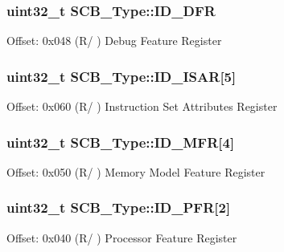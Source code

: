 \subsubsection[{\texorpdfstring{I\+D\+\_\+\+D\+FR}{ID_DFR}}]{ uint32\+\_\+t S\+C\+B\+\_\+\+Type\+::\+I\+D\+\_\+\+D\+FR}\hypertarget{structSCB__Type_a5a8f354519f1ff34593533f095a33679}{}\label{structSCB__Type_a5a8f354519f1ff34593533f095a33679}
Offset\+: 0x048 (R/ ) Debug Feature Register 
\subsubsection[{\texorpdfstring{I\+D\+\_\+\+I\+S\+AR}{ID_ISAR}}]{ uint32\+\_\+t S\+C\+B\+\_\+\+Type\+::\+I\+D\+\_\+\+I\+S\+AR\mbox{[}5\mbox{]}}\hypertarget{structSCB__Type_a468ab7d4458f055dfe2ef420ee6d09d6}{}\label{structSCB__Type_a468ab7d4458f055dfe2ef420ee6d09d6}
Offset\+: 0x060 (R/ ) Instruction Set Attributes Register 
\subsubsection[{\texorpdfstring{I\+D\+\_\+\+M\+FR}{ID_MFR}}]{ uint32\+\_\+t S\+C\+B\+\_\+\+Type\+::\+I\+D\+\_\+\+M\+FR\mbox{[}4\mbox{]}}\hypertarget{structSCB__Type_a1c4c8bc9818ea264c9ceb9b8596c1d05}{}\label{structSCB__Type_a1c4c8bc9818ea264c9ceb9b8596c1d05}
Offset\+: 0x050 (R/ ) Memory Model Feature Register 
\subsubsection[{\texorpdfstring{I\+D\+\_\+\+P\+FR}{ID_PFR}}]{ uint32\+\_\+t S\+C\+B\+\_\+\+Type\+::\+I\+D\+\_\+\+P\+FR\mbox{[}2\mbox{]}}\hypertarget{structSCB__Type_a59c48b5f72df57f333d5827e61d39dd2}{}\label{structSCB__Type_a59c48b5f72df57f333d5827e61d39dd2}
Offset\+: 0x040 (R/ ) Processor Feature Register 
